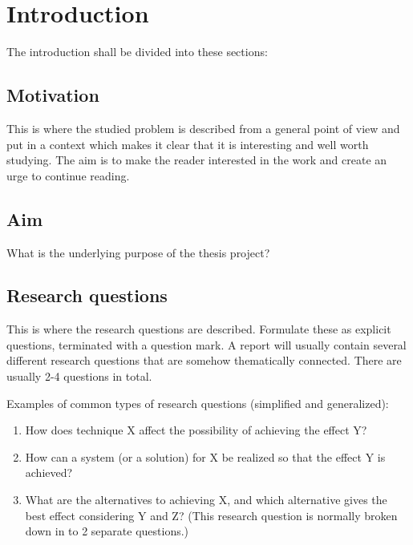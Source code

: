 \chapter{Introduction}
\label{cha:introduction}

The introduction shall be divided into these sections:

\section{Motivation}
\label{sec:motivation}

This is where the studied problem is described from a general
point of view and put in a context which makes it clear that
it is interesting and well worth studying. The aim is to make
the reader interested in the work and create an urge to
continue reading.

\section{Aim}
\label{sec:aim}


What is the underlying purpose of the thesis project?

\section{Research questions}
\label{sec:research-questions}


This is where the research questions are described.
Formulate these as explicit questions, terminated with a
question mark. A report will usually contain several different
research questions that are somehow thematically connected.
There are usually 2-4 questions in total.

Examples of common types of research questions (simplified
and generalized):

\begin{enumerate}
\item How does technique X affect the possibility of achieving the
  effect Y?

\item How can a system (or a solution) for X be realized so
  that the effect Y is achieved?

\item What are the alternatives to
  achieving X, and which alternative gives the best effect considering
  Y and Z? (This research question is normally broken down in to 2
  separate questions.)

\end{enumerate}


